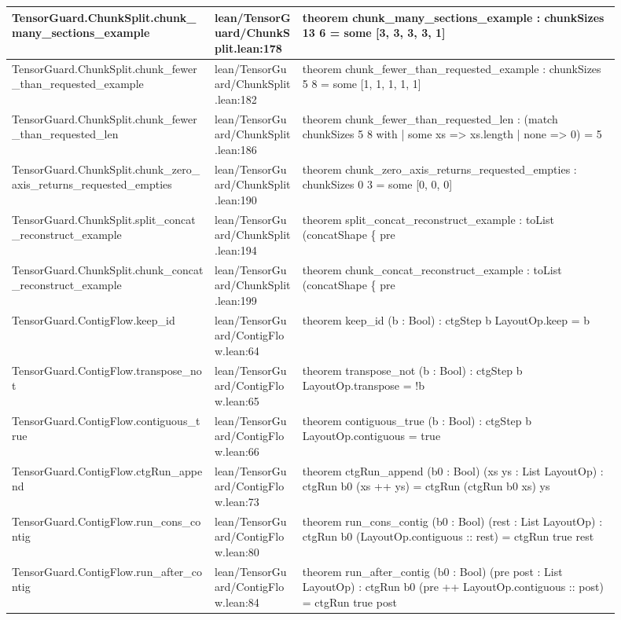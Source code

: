 \documentclass[10pt]{article}
\begin{document}
\begin{longtable}{|p{0.30\linewidth}|p{0.13\linewidth}|p{0.47\linewidth}|}
\hline
TensorGuard.ChunkSplit.chunk\_many\_sections\_example & lean/TensorGuard/ChunkSplit.lean:178 & theorem chunk\_many\_sections\_example : chunkSizes 13 6 = some [3, 3, 3, 3, 1] \\
\hline
TensorGuard.ChunkSplit.chunk\_fewer\_than\_requested\_example & lean/TensorGuard/ChunkSplit.lean:182 & theorem chunk\_fewer\_than\_requested\_example : chunkSizes 5 8 = some [1, 1, 1, 1, 1] \\
\hline
TensorGuard.ChunkSplit.chunk\_fewer\_than\_requested\_len & lean/TensorGuard/ChunkSplit.lean:186 & theorem chunk\_fewer\_than\_requested\_len : (match chunkSizes 5 8 with | some xs => xs.length | none => 0) = 5 \\
\hline
TensorGuard.ChunkSplit.chunk\_zero\_axis\_returns\_requested\_empties & lean/TensorGuard/ChunkSplit.lean:190 & theorem chunk\_zero\_axis\_returns\_requested\_empties : chunkSizes 0 3 = some [0, 0, 0] \\
\hline
TensorGuard.ChunkSplit.split\_concat\_reconstruct\_example & lean/TensorGuard/ChunkSplit.lean:194 & theorem split\_concat\_reconstruct\_example : toList (concatShape \{ pre \\
\hline
TensorGuard.ChunkSplit.chunk\_concat\_reconstruct\_example & lean/TensorGuard/ChunkSplit.lean:199 & theorem chunk\_concat\_reconstruct\_example : toList (concatShape \{ pre \\
\hline
TensorGuard.ContigFlow.keep\_id & lean/TensorGuard/ContigFlow.lean:64 & theorem keep\_id (b : Bool) : ctgStep b LayoutOp.keep = b \\
\hline
TensorGuard.ContigFlow.transpose\_not & lean/TensorGuard/ContigFlow.lean:65 & theorem transpose\_not (b : Bool) : ctgStep b LayoutOp.transpose = !b \\
\hline
TensorGuard.ContigFlow.contiguous\_true & lean/TensorGuard/ContigFlow.lean:66 & theorem contiguous\_true (b : Bool) : ctgStep b LayoutOp.contiguous = true \\
\hline
TensorGuard.ContigFlow.ctgRun\_append & lean/TensorGuard/ContigFlow.lean:73 & theorem ctgRun\_append (b0 : Bool) (xs ys : List LayoutOp) : ctgRun b0 (xs ++ ys) = ctgRun (ctgRun b0 xs) ys \\
\hline
TensorGuard.ContigFlow.run\_cons\_contig & lean/TensorGuard/ContigFlow.lean:80 & theorem run\_cons\_contig (b0 : Bool) (rest : List LayoutOp) : ctgRun b0 (LayoutOp.contiguous :: rest) = ctgRun true rest \\
\hline
TensorGuard.ContigFlow.run\_after\_contig & lean/TensorGuard/ContigFlow.lean:84 & theorem run\_after\_contig (b0 : Bool) (pre post : List LayoutOp) : ctgRun b0 (pre ++ LayoutOp.contiguous :: post) = ctgRun true post \\

\end{longtable}
\end{document}

